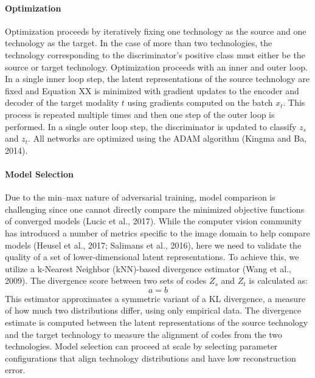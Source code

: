 \paragraph{Optimization}
Optimization proceeds by iteratively fixing one technology as the source and one technology as the target.
In the case of more than two technologies, the technology corresponding to the discriminator’s positive class must either be the source or target technology.
Optimization proceeds with an inner and outer loop.
In a single inner loop step, the latent representations of the source technology are fixed and Equation XX is minimized with gradient updates to the encoder and decoder of the target modality $t$ using gradients computed on the batch $x_t$.
This process is repeated multiple times and then one step of the outer loop is performed.
In a single outer loop step, the discriminator is updated to classify $z_s$ and $z_t$.
All networks are optimized using the ADAM algorithm (Kingma and Ba, 2014).


\paragraph{Model Selection}
Due to the min–max nature of adversarial training, model comparison is challenging since one cannot directly compare the minimized objective functions of converged models (Lucic et al., 2017).
While the computer vision community has introduced a number of metrics specific to the image domain to help compare models (Heusel et al., 2017; Salimans et al., 2016), here we need to validate the quality of a set of lower-dimensional latent representations.
To achieve this, we utilize a k-Nearest Neighbor (kNN)-based divergence estimator (Wang et al., 2009).
The divergence score between two sets of codes $Z_s$ and $Z_t$ is calculated as:
\begin{equation}
	a = b
\end{equation}
This estimator approximates a symmetric variant of a KL divergence, a measure of how much two distributions differ, using only empirical data.
The divergence estimate is computed between the latent representations of the source technology and the target technology to measure the alignment of codes from the two technologies.
Model selection can proceed at scale by selecting parameter configurations that align technology distributions and have low reconstruction error.

